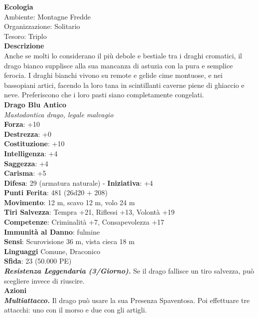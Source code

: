 \begin{multicols}{2}
\textbf{Ecologia}\\
Ambiente: Montagne Fredde\\
Organizzazione: Solitario\\
Tesoro: Triplo\\
\textbf{Descrizione}\\
Anche se molti lo considerano il più debole e bestiale tra i draghi cromatici, il drago bianco supplisce alla sua mancanza di astuzia con la pura e semplice ferocia. I draghi bianchi vivono su remote e gelide cime montuose, e nei bassopiani artici, facendo la loro tana in scintillanti caverne piene di ghiaccio e neve. Preferiscono che i loro pasti siano completamente congelati.\\


\medskip\textbf{Drago Blu Antico}\\
\emph{Mastodontica drago, legale malvagio}\\
\textbf{Forza}: +10\\
\textbf{Destrezza}: +0\\
\textbf{Costituzione}: +10\\
\textbf{Intelligenza}: +4\\
\textbf{Saggezza}: +4\\
\textbf{Carisma}: +5\\	
\textbf{Difesa}: 29 (armatura naturale) - \textbf{Iniziativa}: +4\\
\textbf{Punti Ferita}: 481 (26d20 + 208)\\
\textbf{Movimento}: 12 m, scavo 12 m, volo 24 m\\
\textbf{Tiri Salvezza}: Tempra +21, Riflessi +13, Volontà +19\\
\textbf{Competenze}: Criminalità +7, Consapevolezza +17\\
\textbf{Immunità al Danno}: fulmine\\
\textbf{Sensi}: Scurovisione 36 m, vista cieca 18 m\\
\textbf{Linguaggi} Comune, Draconico\\
\textbf{Sfida}: 23 (50.000 PE)\smallskip\\
\emph{\textbf{Resistenza Leggendaria (3/Giorno).}} Se il drago fallisce un tiro salvezza, può scegliere invece di riuscire. \\
\smallskip\textbf{Azioni}\\
\emph{\textbf{Multiattacco.}} Il drago può usare la sua Presenza Spaventosa. Poi effettuare tre attacchi: uno con il morso e due con gli artigli.\\

\end{multicols}
